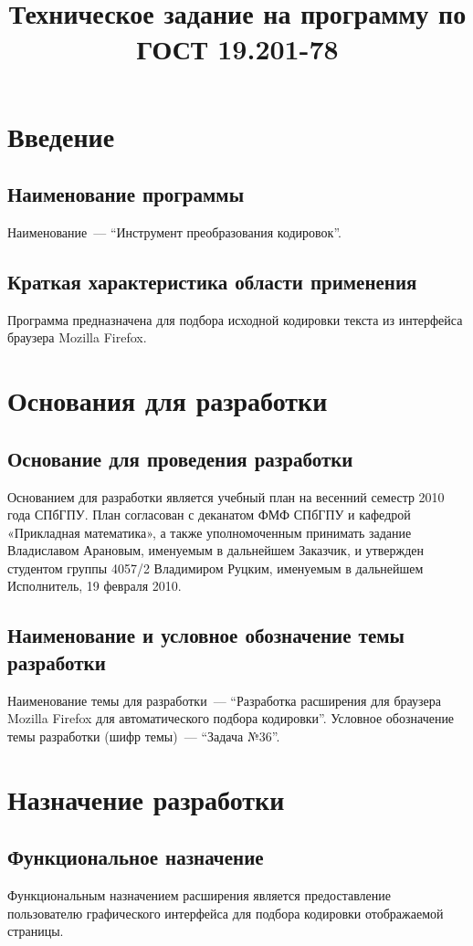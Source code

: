 \documentclass[a4paper,10pt]{article}
\title{Техническое задание на программу по ГОСТ 19.201-78}
\author{}
\date{}
\begin{document}
\maketitle


\section{Введение}
\subsection{Наименование программы}
Наименование~--- ``Инструмент преобразования кодировок''.
\subsection{Краткая характеристика области применения}
Программа предназначена для подбора исходной кодировки текста из интерфейса браузера Mozilla Firefox.

\section{Основания для разработки}
\subsection{Основание для проведения разработки}
Основанием для разработки является учебный план на весенний семестр 2010 года СПбГПУ. 
План согласован с деканатом ФМФ СПбГПУ и кафедрой «Прикладная математика», 
а также уполномоченным принимать задание Владиславом Арановым, 
именуемым в дальнейшем Заказчик, и утвержден студентом группы 4057/2 Владимиром Руцким, 
именуемым в дальнейшем Исполнитель, 19 февраля 2010.
\subsection{Наименование и условное обозначение темы разработки}
Наименование темы для разработки~---
``Разработка расширения для браузера Mozilla Firefox для автоматического подбора кодировки''.
Условное обозначение темы разработки (шифр темы)~--- ``Задача №36''.

\section{Назначение разработки}
\subsection{Функциональное назначение}
Функциональным назначением расширения является предоставление пользователю графического интерфейса 
для подбора кодировки отображаемой страницы.
\end{document}
